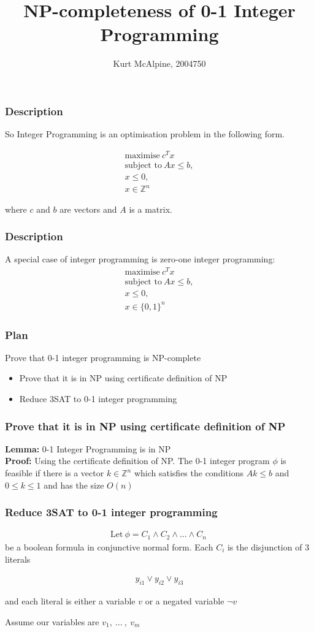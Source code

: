 \documentclass[mathserif]{beamer}
\title{NP-completeness of 0-1 Integer Programming}
\author{Kurt McAlpine, 2004750}
\begin{document}
\frame{\titlepage}

\begin{frame}
\frametitle{Description}
So Integer Programming is an optimisation problem in the following form.

\begin{align*}
\text{maximise}\ c^Tx\\
\text{subject to}\ Ax \leq b,\\
x \leq 0,\\
x \in \mathbb{Z}^n
\end{align*}

where $c$ and $b$ are vectors and $A$ is a matrix.

\end{frame}

\begin{frame}
\frametitle{Description}
A special case of integer programming is zero-one integer programming:
\begin{align*}
\text{maximise}\ c^Tx\\
\text{subject to}\ Ax \leq b,\\
x \leq 0,\\
x \in \{0, 1\}^n
\end{align*}
\end{frame}

\begin{frame}
\frametitle{Plan}
Prove that 0-1 integer programming is NP-complete
\begin{itemize}
\item Prove that it is in NP using certificate definition of NP
\item Reduce 3SAT to 0-1 integer programming
\end{itemize}
\end{frame}

\begin{frame}
\frametitle{Prove that it is in NP using certificate definition of NP}
\textbf{Lemma:} 0-1 Integer Programming is in NP\\
\textbf{Proof:} Using the certificate definition of NP. The 0-1 integer program
$\phi$ is feasible if there is a vector $k \in \mathbb{Z}^n$ which satisfies
the conditions $Ak \leq b$ and $0 \leq k \leq 1$ and has the size $O(n)$
\end{frame}

\begin{frame}
\frametitle{Reduce 3SAT to 0-1 integer programming}
\begin{align*}
\text{Let}\ \phi = C_1 \wedge C_2 \wedge \ldots \wedge C_n\
\end{align*}
be a boolean formula in conjunctive normal form. Each $C_i$ is the disjunction of 3 literals

\begin{align*}
y_{i1} \vee y_{i2} \vee y_{i3}
\end{align*}

and each literal is either a variable $v$ or a negated variable $\neg v$

Assume our variables are $v_1,\ \ldots\ ,\ v_m$

\end{frame}
\end{document}
